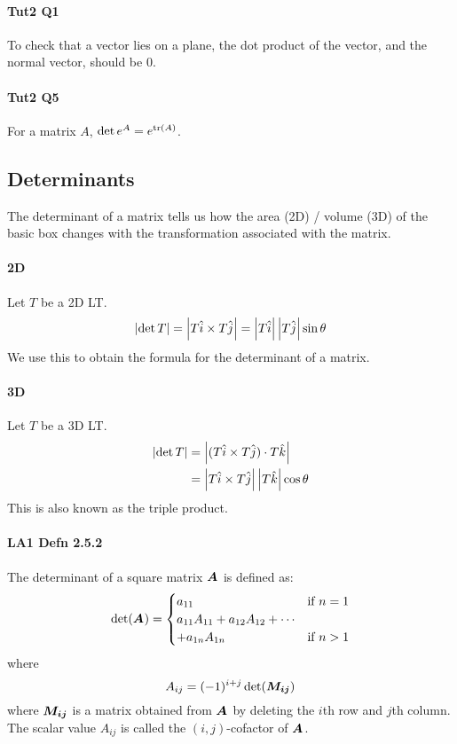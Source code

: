 \documentclass[a4paper]{article}
\begin{document}
\begin{multicols*}{4}
    \paragraph{Tut2 Q1} To check that a vector lies on a plane, the dot product of the vector, and the normal vector, should be 0.
    \paragraph{Tut2 Q5} For a matrix $A$, $\det e^A = e^{\mathrm{tr}(A)}$.
    \subsection*{Determinants}
      The determinant of a matrix tells us how the area (2D) / volume (3D) of the basic box changes with the transformation associated with the matrix.
      \paragraph{2D} Let $T$ be a 2D LT.
      \[ \left\lvert\det{T}\right\rvert = \left\lvert T\hat{i} \times T\hat{j}\right\rvert = \left\lvert T\hat{i}\right\rvert \left\lvert T\hat{j}\right\rvert \sin\theta  \]
        We use this to obtain the formula for the determinant of a  matrix.
      \paragraph{3D} Let $T$ be a 3D LT.
        \begin{align*}
          \left\lvert\det{T}\right\rvert &= \left\lvert(T\hat{i} \times T\hat{j}) \cdot T\hat{k}\right\rvert \\
                        &= \left\lvert T\hat{i} \times T\hat{j}\right\rvert \left\lvert T\hat{k}\right\rvert \cos\theta
        \end{align*}
        This is also known as the triple product.
      \paragraph{LA1 Defn 2.5.2} The determinant of a  square matrix $\boldsymbol{A_{}}$ is defined as:
        \begin{equation*}
          \det(\boldsymbol{A_{}}) =
          \begin{cases}
            a_{11} & \text{if } n=1 \\
            a_{11}A_{11} + a_{12}A_{12} + \cdots \\ + a_{1n}A_{1n} & \text{if } n>1
          \end{cases}
        \end{equation*}
        where
        \begin{equation*}
          A_{ij} = (-1)^{i+j}\det(\boldsymbol{M_{ij}})
        \end{equation*}
        where $\boldsymbol{M_{ij}}$ is a  matrix obtained from $\boldsymbol{A_{}}$ by deleting the $i$th row and $j$th column. The scalar value $A_{ij}$ is called the $(i,j)$-cofactor of $\boldsymbol{A_{}}$.

\end{multicols*}
\end{document}
